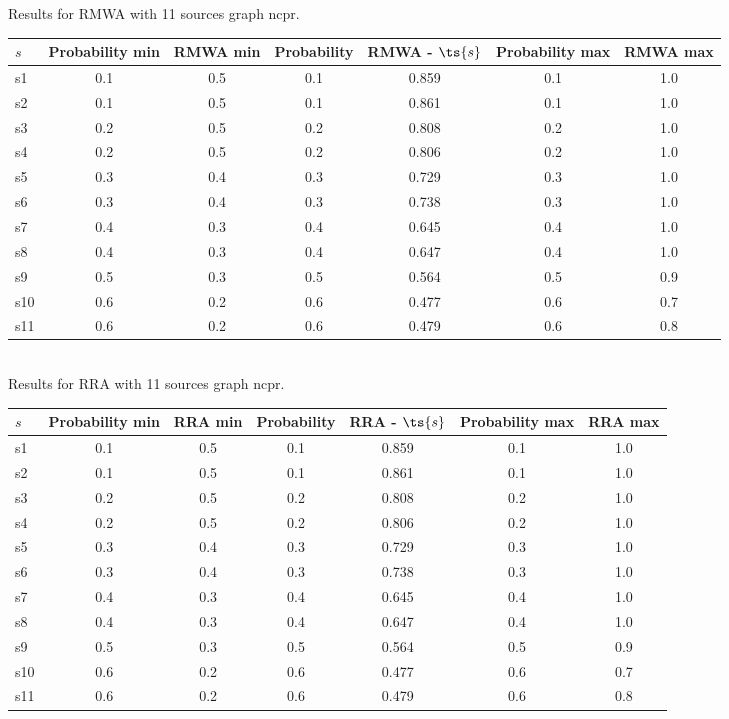 \documentclass{article}
\begin{document}
\noindent Results for RMWA with 11 sources graph ncpr.

\noindent\begin{tabular}{|l|c|c|c|c|c|c|}
\hline
$s$& Probability min & RMWA min & Probability & RMWA - $\ts{s}$ & Probability max & RMWA max\\
\hline
s1 &0.1 & 0.5 & 0.1 & 0.859 & 0.1 & 1.0\\
\hline
s2 &0.1 & 0.5 & 0.1 & 0.861 & 0.1 & 1.0\\
\hline
s3 &0.2 & 0.5 & 0.2 & 0.808 & 0.2 & 1.0\\
\hline
s4 &0.2 & 0.5 & 0.2 & 0.806 & 0.2 & 1.0\\
\hline
s5 &0.3 & 0.4 & 0.3 & 0.729 & 0.3 & 1.0\\
\hline
s6 &0.3 & 0.4 & 0.3 & 0.738 & 0.3 & 1.0\\
\hline
s7 &0.4 & 0.3 & 0.4 & 0.645 & 0.4 & 1.0\\
\hline
s8 &0.4 & 0.3 & 0.4 & 0.647 & 0.4 & 1.0\\
\hline
s9 &0.5 & 0.3 & 0.5 & 0.564 & 0.5 & 0.9\\
\hline
s10 &0.6 & 0.2 & 0.6 & 0.477 & 0.6 & 0.7\\
\hline
s11 &0.6 & 0.2 & 0.6 & 0.479 & 0.6 & 0.8\\
\hline
\end{tabular}\\

\noindent Results for RRA with 11 sources graph ncpr.

\noindent\begin{tabular}{|l|c|c|c|c|c|c|}
\hline
$s$& Probability min & RRA min & Probability & RRA - $\ts{s}$ & Probability max & RRA max\\
\hline
s1 &0.1 & 0.5 & 0.1 & 0.859 & 0.1 & 1.0\\
\hline
s2 &0.1 & 0.5 & 0.1 & 0.861 & 0.1 & 1.0\\
\hline
s3 &0.2 & 0.5 & 0.2 & 0.808 & 0.2 & 1.0\\
\hline
s4 &0.2 & 0.5 & 0.2 & 0.806 & 0.2 & 1.0\\
\hline
s5 &0.3 & 0.4 & 0.3 & 0.729 & 0.3 & 1.0\\
\hline
s6 &0.3 & 0.4 & 0.3 & 0.738 & 0.3 & 1.0\\
\hline
s7 &0.4 & 0.3 & 0.4 & 0.645 & 0.4 & 1.0\\
\hline
s8 &0.4 & 0.3 & 0.4 & 0.647 & 0.4 & 1.0\\
\hline
s9 &0.5 & 0.3 & 0.5 & 0.564 & 0.5 & 0.9\\
\hline
s10 &0.6 & 0.2 & 0.6 & 0.477 & 0.6 & 0.7\\
\hline
s11 &0.6 & 0.2 & 0.6 & 0.479 & 0.6 & 0.8\\
\hline
\end{tabular}\\
\end{document}
